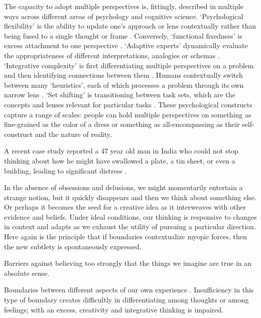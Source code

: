 The capacity to adopt multiple perspectives is, fittingly, described in multiple ways across different areas of psychology and cognitive science. `Psychological flexibility' is the ability to update one's approach or lens contextually rather than being fused to a single thought or frame \citep{cherry2021defining}. Conversely, `functional fixedness' is excess attachment to one perspective \citep{duncker1945problem}. `Adaptive experts' dynamically evaluate the appropriateness of different interpretations, analogies or schemas \citep{hatano1984two, feltovich1997issues, spiro1988cognitive}. `Integrative complexity' is first differentiating multiple perspectives on a problem and then identifying connections between them \citep{tetlock1986value, suedfeld1992conceptual}. Humans contextually switch between many `heuristics', each of which processes a problem through its own narrow lens \citep{gigerenzer2009homo}. `Set shifting' is transitioning between task sets, which are the concepts and lenses relevant for particular tasks \citep{miyake2000unity, grant1948behavioral}. These psychological constructs capture a range of scales: people can hold multiple perspectives on something as fine-grained as the color of a dress or something as all-encompassing as their self-construct and the nature of reality. 


A recent case study reported a 47 year old man in India who could not stop thinking about how he might have swallowed a plate, a tin sheet, or even a building, leading to significant distress \citep{karnam2025obsessive}.

In the absence of obsessions and delusions, we might momentarily entertain a strange notion, but it quickly disappears and then we think about something else. Or perhaps it becomes the seed for a creative idea as it interweaves with other evidence and beliefs. Under ideal conditions, our thinking is responsive to changes in context and adapts as we exhaust the utility of pursuing a particular direction. Here again is the principle that if boundaries contextualize myopic forces, then the new subtlety is spontaneously expressed. 

Barriers against believing too strongly that the things we imagine are true in an absolute sense.

Boundaries between different aspects of our own experience \citep{hartmann1991boundaries}. Insufficiency in this type of boundary creates difficultly in differentiating among thoughts or among feelings; with an excess, creativity and integrative thinking is impaired. 

